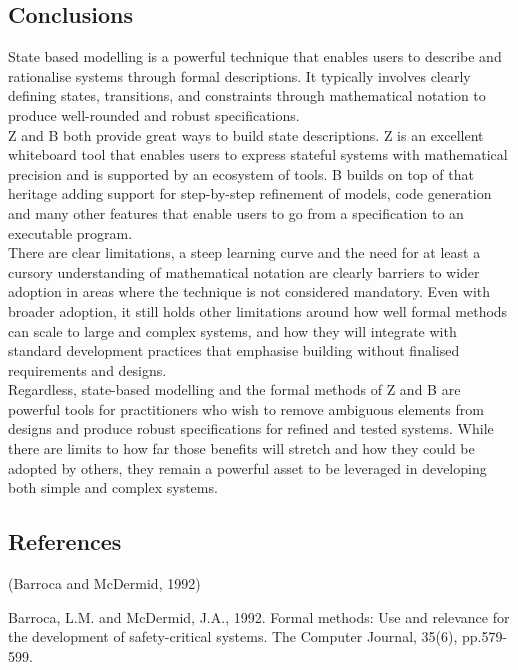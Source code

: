 \documentclass{article}
\begin{document}
\subsection*{Conclusions}

State based modelling is a powerful technique that enables users to describe and rationalise systems through formal descriptions. It typically involves clearly defining states, transitions, and constraints through mathematical notation to produce well-rounded and robust specifications. \\
\newline
Z and B both provide great ways to build state descriptions. Z is an excellent whiteboard tool that enables users to express stateful systems with mathematical precision and is supported by an ecosystem of tools. B builds on top of that heritage adding support for step-by-step refinement of models, code generation and many other features that enable users to go from a specification to an executable program. \\
\newline
There are clear limitations, a steep learning curve and the need for at least a cursory understanding of mathematical notation are clearly barriers to wider adoption in areas where the technique is not considered mandatory. Even with broader adoption, it still holds other limitations around how well formal methods can scale to large and complex systems, and how they will integrate with standard development practices that emphasise building without finalised requirements and designs. \\
\newline
Regardless, state-based modelling and the formal methods of Z and B are powerful tools for practitioners who wish to remove ambiguous elements from designs and produce robust specifications for refined and tested systems. While there are limits to how far those benefits will stretch and how they could be adopted by others, they remain a powerful asset to be leveraged in developing both simple and complex systems. 
\pagebreak

\subsection*{References}

(Barroca and McDermid, 1992)

Barroca, L.M. and McDermid, J.A., 1992. Formal methods: Use and relevance for the development of safety-critical systems. The Computer Journal, 35(6), pp.579-599.
\end{document}
